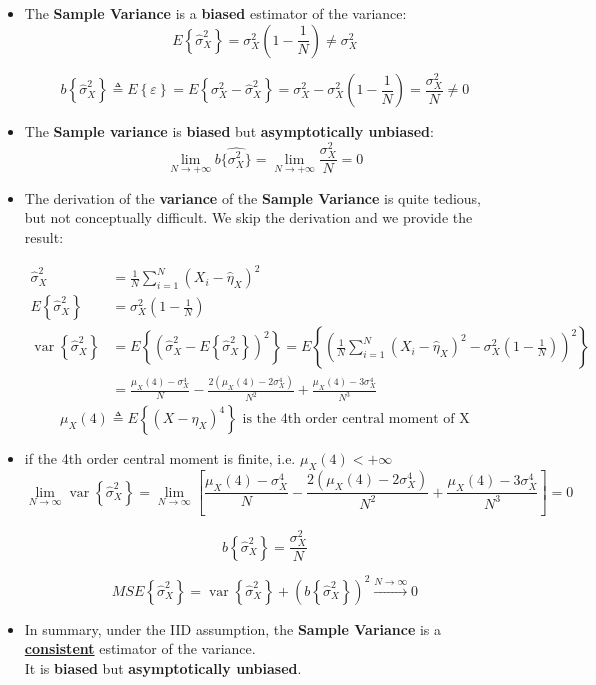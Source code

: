 \begin{itemize}
\item The \textbf{Sample Variance} is a \textbf{biased} estimator of the variance:
\[
E \left\{ \hat{\sigma}_X^2 \right\} = \sigma_X^2 \left( 1 - \frac{1}{N} \right) \neq \sigma_X^2
\]

\[
b \left\{ \hat{\sigma}_X^2 \right\} \triangleq E \left\{ \varepsilon \right\}
= E \left\{ \sigma_X^2 - \hat{\sigma}_X^2 \right\}
= \sigma_X^2 - \sigma_X^2 \left( 1 - \frac{1}{N} \right)
= \frac{\sigma_X^2}{N} \neq 0
\]

\item The \textbf{Sample variance} is \textbf{biased} but \textbf{asymptotically unbiased}:
\[
\lim_{N\rightarrow+\infty}b\{\hat{\sigma_X^2}\}=\lim_{N\rightarrow+\infty}\frac{\sigma_X^2}{N}=0
\]

\item The derivation of the \textbf{variance} of the \textbf{Sample Variance} is quite tedious, but not conceptually difficult. We skip the derivation and we provide the result:

\[
\begin{aligned}
\hat{\sigma}_X^2 &= \frac{1}{N} \sum_{i=1}^N (X_i - \hat{\eta}_X)^2 \\[1.5ex]
E\left\{\hat{\sigma}_X^2\right\} &= \sigma_X^2 \left(1 - \frac{1}{N}\right) \\[1.5ex]
\operatorname{var}\left\{\hat{\sigma}_X^2\right\} &= E\left\{\left(\hat{\sigma}_X^2 - E\left\{\hat{\sigma}_X^2\right\}\right)^2\right\}
= E\left\{\left(\frac{1}{N} \sum_{i=1}^N (X_i - \hat{\eta}_X)^2 - \sigma_X^2 \left(1 - \frac{1}{N}\right)\right)^2\right\} \\[1.5ex]
&= \frac{\mu_X(4) - \sigma_X^4}{N}
- \frac{2 \left(\mu_X(4) - 2\sigma_X^4\right)}{N^2}
+ \frac{\mu_X(4) - 3\sigma_X^4}{N^3}
\end{aligned}
\]
\[
\mu_X(4) \triangleq E\left\{(X - \eta_X)^4\right\} \text{ is the 4th order central moment of X}
\]
\item if the 4th order central moment is finite, i.e. \(\mu_X(4)<+\infty\)
\[
\lim_{N \to \infty} \operatorname{var} \left\{ \hat{\sigma}_X^2 \right\}
= \lim_{N \to \infty} \left[
\frac{\mu_X(4) - \sigma_X^4}{N}
- \frac{2\left(\mu_X(4) - 2\sigma_X^4\right)}{N^2}
+ \frac{\mu_X(4) - 3\sigma_X^4}{N^3}
\right] = 0
\]

\[
b\left\{\hat{\sigma}_X^2\right\} = \frac{\sigma_X^2}{N}
\]

\[
MSE\left\{\hat{\sigma}_X^2\right\}
= \operatorname{var}\left\{\hat{\sigma}_X^2\right\}
+ \left(b\left\{\hat{\sigma}_X^2\right\}\right)^2
\xrightarrow{N \to \infty} 0
\]
\item In summary, under the IID assumption, the \textbf{Sample Variance} is a \underline{\textbf{consistent}} estimator of the variance.\\
It is \textbf{biased} but \textbf{asymptotically unbiased}.


\end{itemize}
